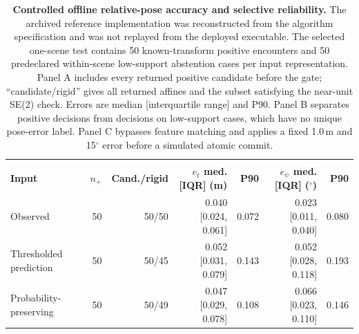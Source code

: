 \documentclass[11pt]{article}
\begin{document}
\begin{table}[H]
  \centering
  \caption{\textbf{Controlled offline relative-pose accuracy and selective reliability.} The archived reference implementation was reconstructed from the algorithm specification and was not replayed from the deployed executable. The selected one-scene test contains 50 known-transform positive encounters and 50 predeclared within-scene low-support abstention cases per input representation. Panel A includes every returned positive candidate before the gate; ``candidate/rigid'' gives all returned affines and the subset satisfying the near-unit SE(2) check. Errors are median [interquartile range] and P90. Panel B separates positive decisions from decisions on low-support cases, which have no unique pose-error label. Panel C bypasses feature matching and applies a fixed 1.0\,m and 15$^{\circ}$ error before a simulated atomic commit.}
  \begingroup
  \setlength{\tabcolsep}{2.3pt}
  \renewcommand{\arraystretch}{1.06}
  \begin{tabularx}{\textwidth}{@{}>{\raggedright\arraybackslash}Xrrrrrr@{}}
    \toprule
    \multicolumn{7}{l}{\textbf{Panel A: error on returned candidates from positive encounters}} \\
    \rowcolor{TableHeader}
    \textbf{Input} & \textbf{$n_{+}$} & \textbf{Cand./rigid} &
    \shortstack{\textbf{$e_t$ med.[IQR]}\\\textbf{(m)}} & \textbf{P90} &
    \shortstack{\textbf{$e_{\psi}$ med.[IQR]}\\\textbf{($^{\circ}$)}} & \textbf{P90} \\
    \midrule
    Observed & 50 & 50/50 & 0.040 [0.024, 0.061] & 0.072 & 0.023 [0.011, 0.040] & 0.080 \\
    Thresholded prediction & 50 & 50/45 & 0.052 [0.031, 0.079] & 0.143 & 0.052 [0.028, 0.118] & 0.193 \\
    Probability-preserving & 50 & 50/49 & 0.047 [0.029, 0.078] & 0.108 & 0.066 [0.023, 0.110] & 0.146 \\
    \bottomrule
  \end{tabularx}


\end{table}
\end{document}

